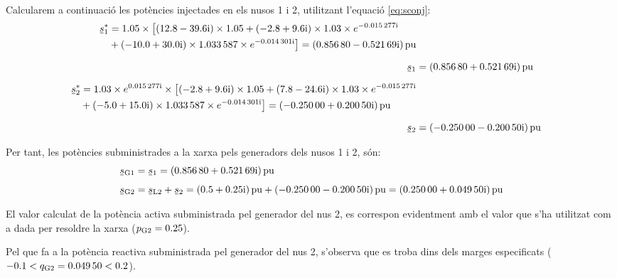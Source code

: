 \begin{exemple}
    Calcularem a continuació les potències injectades en els nusos 1 i
    2, utilitzant l'equació \eqref{eq:sconj}:
    \begin{align*}
    \begin{split}
    \cmplx{s}_1^* &= \num{1,05} \times\bigl[ (\complexnum{12,8-j39,6}) \times \num{1,05}
    +
    (\complexnum{-2,8+j9,6}) \times \num{1,03}\times e^{\complexnum{-j0,015277}}  \\
    &+ (\complexnum{-10,0+j30,0}) \times \num{1,033587}\times e^{ \complexnum{-j0,014301}}
    \bigr] = \complexqty{0,85680 - j 0,52169}{pu}
    \end{split} \\[1.5ex]
    \cmplx{s}_1 &= \complexqty{0,85680 + j 0,52169}{pu} \\[1.5ex]
    \begin{split}
    \cmplx{s}_2^* &= \num{1,03} \times e^{\complexnum{j0,015277}} \times\bigl[
    (\complexnum{-2,8+j9,6}) \times \num{1,05} +
     (\complexnum{7,8-j24,6}) \times \num{1,03}\times e^{\complexnum{-j0,015277}} \\
    & + (\complexnum{-5,0+j15,0}) \times \num{1,033587}\times e^{\complexnum{-j0,014301}}
    \bigr] = \complexqty{-0,25000 + j 0,20050}{pu}
    \end{split} \\[1.5ex]
     \cmplx{s}_2 &= \complexqty{-0,25000 - j 0,20050}{pu}
    \end{align*}

    Per tant, les potències subministrades a la xarxa pels generadors
    dels nusos 1 i 2, són:
    \begin{align*}
    \cmplx{s}\ped{G1} &= \cmplx{s}_1 = \complexqty{0,85680 + j 0,52169}{pu} \\[1ex]
    \cmplx{s}\ped{G2} &= \cmplx{s}\ped{L2} + \cmplx{s}_2 = \complexqty{0,5 + j0,25}{pu} +
    \complexqty{-0,25000 - j 0,20050}{pu}  = \complexqty{0,25000 + j 0,04950}{pu}
    \end{align*}

    El valor calculat de la potència activa subministrada pel generador
    del nus 2, es
     correspon evidentment amb el valor que s'ha utilitzat com a dada per
    resoldre la xarxa ($p_\mathrm{G2}=\num{0,25}$).

    Pel que fa a la potència reactiva subministrada pel generador del
    nus 2, s'observa que es troba dins dels  marges especificats
    ($\num{-0,1}< q_\mathrm{G2}=\num{0,04950} <\num{0,2}$).
\end{exemple}


